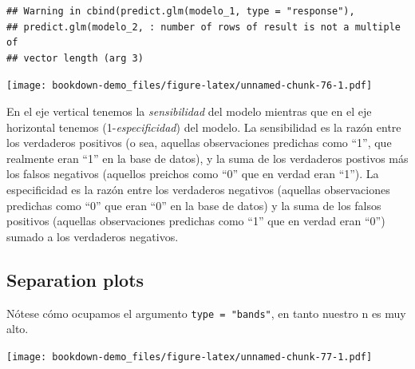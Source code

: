 \documentclass[]{book}
\newenvironment{Shaded}{\begin{snugshade}}{\end{snugshade}}
\newcommand{\KeywordTok}[1]{\textcolor[rgb]{0.13,0.29,0.53}{\textbf{#1}}}
\newcommand{\DataTypeTok}[1]{\textcolor[rgb]{0.13,0.29,0.53}{#1}}
\newcommand{\DecValTok}[1]{\textcolor[rgb]{0.00,0.00,0.81}{#1}}
\newcommand{\StringTok}[1]{\textcolor[rgb]{0.31,0.60,0.02}{#1}}
\newcommand{\OperatorTok}[1]{\textcolor[rgb]{0.81,0.36,0.00}{\textbf{#1}}}
\newcommand{\NormalTok}[1]{#1}
\begin{document}
\begin{verbatim}
## Warning in cbind(predict.glm(modelo_1, type = "response"),
## predict.glm(modelo_2, : number of rows of result is not a multiple of
## vector length (arg 3)
\end{verbatim}

\texttt{[image: bookdown-demo\_files/figure-latex/unnamed-chunk-76-1.pdf]}

En el eje vertical tenemos la \emph{sensibilidad} del modelo mientras
que en el eje horizontal tenemos (1-\emph{especificidad}) del modelo. La
sensibilidad es la razón entre los verdaderos positivos (o sea, aquellas
observaciones predichas como ``1'', que realmente eran ``1'' en la base
de datos), y la suma de los verdaderos postivos más los falsos negativos
(aquellos preichos como ``0'' que en verdad eran ``1''). La
especificidad es la razón entre los verdaderos negativos (aquellas
observaciones predichas como ``0'' que eran ``0'' en la base de datos) y
la suma de los falsos positivos (aquellas observaciones predichas como
``1'' que en verdad eran ``0'') sumado a los verdaderos negativos.

\subsection{Separation plots}\label{separation-plots}

Nótese cómo ocupamos el argumento \texttt{type\ =\ "bands"}, en tanto
nuestro n es muy alto.

\begin{Shaded}
\end{Shaded}

\texttt{[image: bookdown-demo\_files/figure-latex/unnamed-chunk-77-1.pdf]}

\begin{Shaded}
\end{Shaded}
\end{document}
